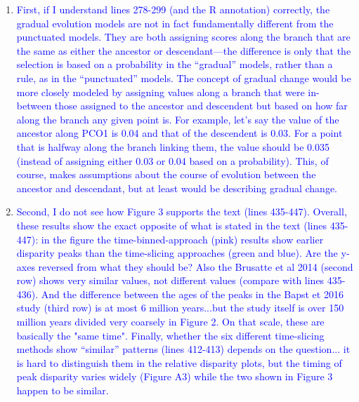 \documentclass[12pt,letterpaper]{article}
\begin{document}
\begin{enumerate}



\item{\textcolor{blue}{First, if I understand lines 278-299 (and the R annotation) correctly, the gradual evolution models are not in fact fundamentally different from the punctuated models. They are both assigning scores along the branch that are the same as either the ancestor or descendant—the difference is only that the selection is based on a probability in the ``gradual'' models, rather than a rule, as in the ``punctuated'' models. The concept of gradual change would be more closely modeled by assigning values along a branch that were in-between those assigned to the ancestor and descendent but based on how far along the branch any given point is. For example, let’s say the value of the ancestor along PCO1 is 0.04 and that of the descendent is 0.03. For a point that is halfway along the branch linking them, the value should be 0.035 (instead of assigning either 0.03 or 0.04 based on a probability). This, of course, makes assumptions about the course of evolution between the ancestor and descendant, but at least would be describing gradual change.}}






\item{\textcolor{blue}{Second, I do not see how Figure 3 supports the text (lines 435-447). Overall, these results show the exact opposite of what is stated in the text (lines 435-447): in the figure the time-binned-approach (pink) results show earlier disparity peaks than the time-slicing approaches (green and blue). Are the y-axes reversed from what they should be? Also the Brusatte et al 2014 (second row) shows very similar values, not different values (compare with lines 435-436). And the difference between the ages of the peaks in the Bapst et 2016 study (third row) is at most 6 million years...but the study itself is over 150 million years divided very coarsely in Figure 2.  On that scale, these are basically the "same time". Finally, whether the six different time-slicing methods show ``similar'' patterns (lines 412-413) depends on the question... it is hard to distinguish them in the relative disparity plots, but the timing of peak disparity varies widely (Figure A3) while the two shown in Figure 3 happen to be similar.}}




\end{enumerate}
\end{document}
